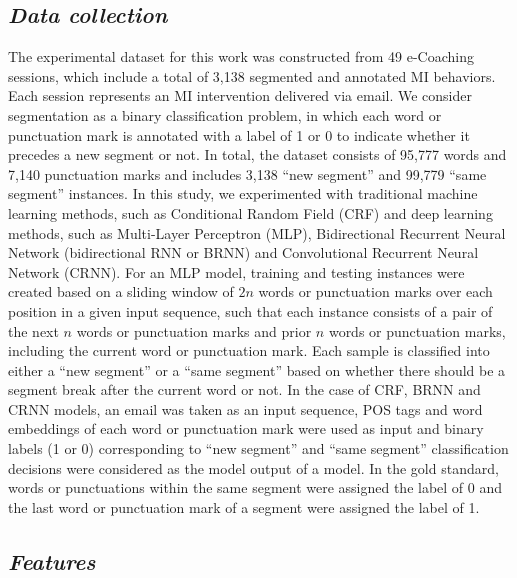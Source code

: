 \documentclass{amia}
\begin{document}
\subsection*{\textit{Data collection}}
The experimental dataset for this work was constructed from 49 e-Coaching sessions, which include a total of 3,138 segmented and annotated MI behaviors. Each session represents an MI intervention delivered via email. We consider segmentation as a binary classification problem, in which each word or punctuation mark is annotated with a label of 1 or 0 to indicate whether it precedes a new segment or not. In total, the dataset consists of 95,777 words and 7,140 punctuation marks and includes 3,138 ``new segment'' and 99,779 ``same segment'' instances. In this study, we experimented with traditional machine learning methods, such as Conditional Random Field (CRF)\cite{lafferty2001conditional} and deep learning methods, such as Multi-Layer Perceptron (MLP),\cite{rumelhart1986learning} Bidirectional Recurrent Neural Network (bidirectional RNN or BRNN)\cite{schuster1997bidirectional} and Convolutional Recurrent Neural Network (CRNN).\cite{treviso2017sentence} For an MLP model, training and testing instances were created based on a sliding window of $2n$ words or punctuation marks over each position in a given input sequence, such that each instance consists of a pair of the next $n$ words or punctuation marks and prior $n$ words or punctuation marks, including the current word or punctuation mark. Each sample is classified into either a ``new segment'' or a ``same segment'' based on whether there should be a segment break after the current word or not. In the case of CRF, BRNN and CRNN models, an email was taken as an input sequence, POS tags and word embeddings of each word or punctuation mark were used as input and binary labels (1 or 0) corresponding to ``new segment'' and ``same segment'' classification decisions were considered as the model output of a model. In the gold standard, words or punctuations within the same segment were assigned the label of 0 and the last word or punctuation mark of a segment were assigned the label of 1.     

\subsection*{\textit{Features}}
\end{document}

